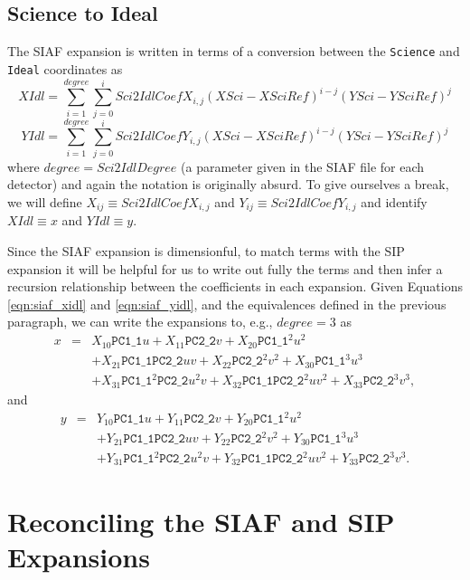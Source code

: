 \documentclass[10pt]{article}
\newcommand{\NCu}{\ensuremath{\mathtt{PC1\_1}}}
\newcommand{\NCv}{\ensuremath{\mathtt{PC2\_2}}}
\begin{document}
\subsection{Science to Ideal}
The SIAF expansion is written in terms of a conversion between the {\tt Science}
and {\tt Ideal} coordinates as
\begin{equation}
\label{eqn:siaf_xidl}
XIdl = \sum_{i=1}^{degree} \sum_{j=0}^{i} Sci2IdlCoefX_{i,j}\left(XSci-XSciRef\right)^{i-j}\left(YSci-YSciRef\right)^j
\end{equation}
\begin{equation}
\label{eqn:siaf_yidl}
YIdl = \sum_{i=1}^{degree} \sum_{j=0}^{i} Sci2IdlCoefY_{i,j}\left(XSci-XSciRef\right)^{i-j}\left(YSci-YSciRef\right)^j
\end{equation}
\noindent
where $degree=Sci2IdlDegree$ (a parameter given in the SIAF file for each detector)
and again the notation is originally absurd. To give ourselves a break, we will 
define $X_{ij} \equiv Sci2IdlCoefX_{i,j}$ and $Y_{ij} \equiv Sci2IdlCoefY_{i,j}$ and
identify $XIdl\equiv x$ and $YIdl\equiv y$.

Since the SIAF expansion is dimensionful, to match terms with the SIP expansion
it will be helpful for us to write out fully the terms and then infer a recursion
relationship between the coefficients in each expansion. Given Equations
\ref{eqn:siaf_xidl} and \ref{eqn:siaf_yidl}, and the equivalences defined in the
previous paragraph, we can write the expansions to, e.g., $degree=3$ as
\begin{eqnarray}
\label{eqn:siaf_x}
x &=& X_{10} \NCu u + X_{11} \NCv v + X_{20} \NCu^2 u^2 \\
  &&+ X_{21}\NCu \NCv uv + X_{22} \NCv^2 v^2 + X_{30} \NCu^3 u^3 \nonumber \\
  && + X_{31}\NCu^2 \NCv u^2 v + X_{32} \NCu \NCv^2 u v^2  + X_{33} \NCv^3 v^3\nonumber,
\end{eqnarray}
\noindent
and
\begin{eqnarray}
\label{eqn:siaf_y}
y &=& Y_{10} \NCu u + Y_{11} \NCv v + Y_{20} \NCu^2 u^2 \\
  &&+ Y_{21}\NCu \NCv uv + Y_{22} \NCv^2 v^2 + Y_{30} \NCu^3 u^3 \nonumber \\
  && + Y_{31}\NCu^2 \NCv u^2 v + Y_{32} \NCu \NCv^2 u v^2  + Y_{33} \NCv^3 v^3\nonumber.
\end{eqnarray}

\section{Reconciling the SIAF and SIP Expansions}
\end{document}
